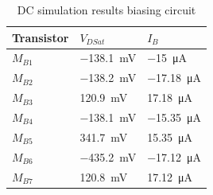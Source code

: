 \begin{table}[h]
    \centering
    \caption{DC simulation results biasing circuit}
    \begin{tabularx}{\textwidth}{>{\centering\arraybackslash}X >{\centering\arraybackslash}X >{\centering\arraybackslash}X}
        \toprule
        \textbf{Transistor} & \textbf{$V_{DSat}$} & \textbf{$I_B$}\\
        \midrule
        $M_{B1}$ & \SI{-138.1}{\milli\volt} & \SI{-15}{\micro\ampere}\\
        \midrule
        $M_{B2}$ & \SI{-138.2}{\milli\volt} & \SI{-17.18}{\micro\ampere}\\
        \midrule
        $M_{B3}$ & \SI{120.9}{\milli\volt} & \SI{17.18}{\micro\ampere}\\
        \midrule
        $M_{B4}$ & \SI{-138.1}{\milli\volt} & \SI{-15.35}{\micro\ampere}\\
        \midrule
        $M_{B5}$ & \SI{341.7}{\milli\volt} & \SI{15.35}{\micro\ampere}\\
        \midrule
        $M_{B6}$ & \SI{-435.2}{\milli\volt} & \SI{-17.12}{\micro\ampere}\\
        \midrule
        $M_{B7}$ & \SI{120.8}{\milli\volt} & \SI{17.12}{\micro\ampere}\\
        \bottomrule
    \end{tabularx}
    \label{tab:DC}
\end{table}

